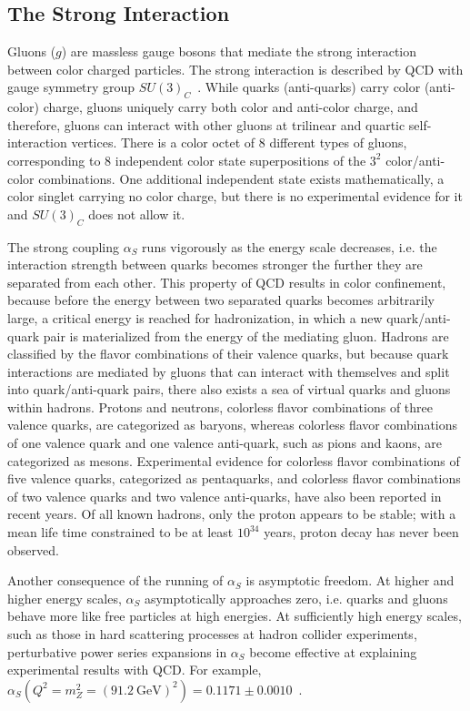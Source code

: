 \subsection{The Strong Interaction}
Gluons ($g$) are massless gauge bosons that mediate the strong interaction between color charged particles.
The strong interaction is described by QCD with gauge symmetry group $SU(3)_C$~\cite{nagashima_2013_V1}.
While quarks (anti-quarks) carry color (anti-color) charge, gluons uniquely carry both color and anti-color charge, and therefore, gluons can interact with other gluons at trilinear and quartic self-interaction vertices.
There is a color octet of 8 different types of gluons, corresponding to 8 independent color state superpositions of the $3^2$ color/anti-color combinations.
One additional independent state exists mathematically, a color singlet carrying no color charge, but there is no experimental evidence for it and $SU(3)_C$ does not allow it.

The strong coupling $\alpha_S$ runs vigorously as the energy scale decreases, i.e. the interaction strength between quarks becomes stronger the further they are separated from each other.
This property of QCD results in color confinement, because before the energy between two separated quarks becomes arbitrarily large, a critical energy is reached for hadronization, in which a new quark/anti-quark pair is materialized from the energy of the mediating gluon.
Hadrons are classified by the flavor combinations of their valence quarks, but because quark interactions are mediated by gluons that can interact with themselves and split into quark/anti-quark pairs, there also exists a sea of virtual quarks and gluons within hadrons.
Protons and neutrons, colorless flavor combinations of three valence quarks, are categorized as baryons, whereas colorless flavor combinations of one valence quark and one valence anti-quark, such as pions and kaons, are categorized as mesons.
Experimental evidence for colorless flavor combinations of five valence quarks, categorized as pentaquarks, and colorless flavor combinations of two valence quarks and two valence anti-quarks, have also been reported in recent years.
Of all known hadrons, only the proton appears to be stable; with a mean life time constrained to be at least $10^{34}$ years, proton decay has never been observed.

Another consequence of the running of $\alpha_S$ is asymptotic freedom.
At higher and higher energy scales, $\alpha_S$ asymptotically approaches zero, i.e. quarks and gluons behave more like free particles at high energies.
At sufficiently high energy scales, such as those in hard scattering processes at hadron collider experiments, perturbative power series expansions in $\alpha_S$ become effective at explaining experimental results with QCD.
For example, $\alpha_S(Q^2 = m_Z^2 =  {(\SI{91.2}{\GeV})}^2) = 0.1171 \pm 0.0010$~\cite{PhysRevD.103.034028}.

